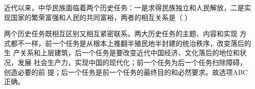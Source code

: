 \question 近代以来，中华民族面临着两个历史任务：一是求得民族独立和人民解放，二是实现国家的繁荣富强和人民的共同富裕，两者的相互关系是（
）
\par{}
\begin{solution}两个历史任务既相互区别又相互紧密联系。两大历史任务的主题、内容和实现
方式都不一样，前一个任务是从根本上推翻半殖民地半封建的统治秩序，改变落后的生
产关系和上层建筑，后一个任务是要改变近代中国经济、文化落后的地位和状况，发展
社会生产力，实现中国的现代化；前一个任务为后一个任务扫除障碍，创造必要的前
提；后一个任务是前一个任务的最终目的和必然要求。故选项ABC正确。
\end{solution}
